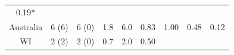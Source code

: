 \documentclass[fleqn,10pt,lineno]{wlpeerj} %
\theoremstyle{definition}
\theoremstyle{definition}
\theoremstyle{definition}
\theoremstyle{remark}
\begin{document}
\begin{longtable}[]{@{}crrrrllrl@{}}
\begin{minipage}[t]{0.07\columnwidth}
0.19*\strut
\end{minipage}\tabularnewline
\begin{minipage}[t]{0.12\columnwidth}\centering\strut
Australia\strut
\end{minipage} & \begin{minipage}[t]{0.08\columnwidth}\raggedleft\strut
6 (6)\strut
\end{minipage} & \begin{minipage}[t]{0.13\columnwidth}\raggedleft\strut
6 (0)\strut
\end{minipage} & \begin{minipage}[t]{0.04\columnwidth}\raggedleft\strut
1.8\strut
\end{minipage} & \begin{minipage}[t]{0.05\columnwidth}\raggedleft\strut
6.0\strut
\end{minipage} & \begin{minipage}[t]{0.11\columnwidth}\raggedright\strut
0.83\strut
\end{minipage} & \begin{minipage}[t]{0.06\columnwidth}\raggedright\strut
1.00\strut
\end{minipage} & \begin{minipage}[t]{0.06\columnwidth}\raggedleft\strut
0.48\strut
\end{minipage} & \begin{minipage}[t]{0.07\columnwidth}\raggedright\strut
0.12\strut
\end{minipage}\tabularnewline
\begin{minipage}[t]{0.12\columnwidth}\centering\strut
WI\strut
\end{minipage} & \begin{minipage}[t]{0.08\columnwidth}\raggedleft\strut
2 (2)\strut
\end{minipage} & \begin{minipage}[t]{0.13\columnwidth}\raggedleft\strut
2 (0)\strut
\end{minipage} & \begin{minipage}[t]{0.04\columnwidth}\raggedleft\strut
0.7\strut
\end{minipage} & \begin{minipage}[t]{0.05\columnwidth}\raggedleft\strut
2.0\strut
\end{minipage} & \begin{minipage}[t]{0.11\columnwidth}\raggedright\strut
0.50\strut
\end{minipage} & \begin{minipage}[t]{0.06\columnwidth}\raggedright\strut

\end{minipage}
\end{longtable}
\end{document}
